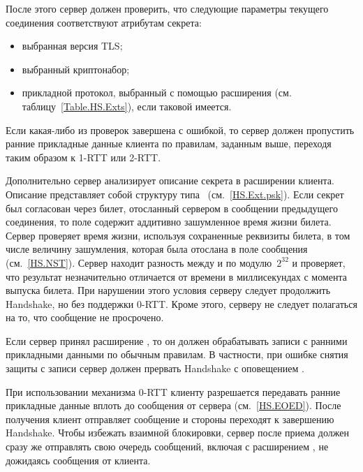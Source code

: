 После этого сервер должен проверить, что следующие параметры текущего соединения 
соответствуют атрибутам секрета:
\begin{itemize} 
\item
выбранная версия TLS;
%
%
\item
выбранный криптонабор;
\item
прикладной протокол, выбранный с помощью расширения 
 (см. 
таблицу~\ref{Table.HS.Exts}), если таковой имеется.
\end{itemize}
%
Если какая-либо из проверок завершена с ошибкой, то сервер должен пропустить ранние 
прикладные данные клиента по правилам, заданным выше, переходя таким образом 
к 1-RTT или 2-RTT.


Дополнительно сервер анализирует описание секрета в расширении
 клиента. Описание представляет собой
структуру типа~ (см.~\ref{HS.Ext.psk}). Если секрет был
согласован через билет, отосланный сервером в сообщении
 предыдущего соединения, то поле
 содержит аддитивно зашумленное время
жизни билета.
%
Сервер проверяет время жизни, используя сохраненные реквизиты билета,
в том числе величину зашумления, которая была отослана в поле 
 сообщения~ (см.~\ref{HS.NST}).
%
Сервер находит разность между  и 
 по модулю~$2^{32}$ и проверяет, что 
результат незначительно отличается от времени в миллисекундах с момента выпуска 
билета. При нарушении этого условия серверу следует продолжить Handshake, но 
без поддержки 0-RTT. Кроме этого, серверу не следует полагаться на то, что 
сообщение  не просрочено.

Если сервер принял расширение , то он должен обрабатывать 
записи с ранними прикладными данными по обычным правилам. В частности, при 
ошибке снятия защиты с записи сервер должен прервать Handshake с оповещением 
.

При использовании механизма 0-RTT клиенту разрешается передавать ранние
прикладные данные вплоть до сообщения  от сервера
(см.~\ref{HS.EOED}). После получения  клиент отправляет
сообщение  и стороны переходят к завершению Handshake.
Чтобы избежать взаимной блокировки, сервер после приема  должен
сразу же отправлять свою очередь сообщений, включая 
с расширением , не дожидаясь сообщения 
 от клиента.


